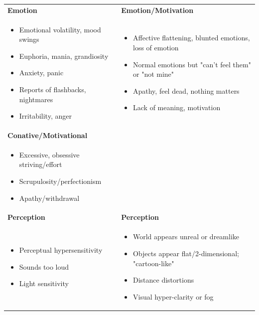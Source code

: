 \documentclass[12pt,letterpaper]{book}
\newenvironment{compactitemize}
{\begin{itemize}[nosep, leftmargin=1em, itemsep=0pt, topsep=0pt]}
{\end{itemize}}
\begin{document}
\begin{longtable}{p{}|p{}}
\textbf{Emotion} & \textbf{Emotion/Motivation} \\*
\begin{compactitemize}
\item Emotional volatility, mood swings
\item Euphoria, mania, grandiosity
\item Anxiety, panic
\item Reports of flashbacks, nightmares
\item Irritability, anger
\end{compactitemize}
&
\begin{compactitemize}
\item Affective flattening, blunted emotions, loss of emotion
\item Normal emotions but "can't feel them" or "not mine"
\item Apathy, feel dead, nothing matters
\item Lack of meaning, motivation
\end{compactitemize} \\[1ex]

\textbf{Conative/Motivational} & \\*
\begin{compactitemize}
\item Excessive, obsessive striving/effort
\item Scrupulosity/perfectionism
\item Apathy/withdrawal
\end{compactitemize}
& \\[1ex]

\textbf{Perception} & \textbf{Perception} \\*
\begin{compactitemize}
\item Perceptual hypersensitivity
\item Sounds too loud
\item Light sensitivity
\end{compactitemize}
&
\begin{compactitemize}
\item World appears unreal or dreamlike
\item Objects appear flat/2-dimensional; "cartoon-like"
\item Distance distortions
\item Visual hyper-clarity or fog
\end{compactitemize} \\[1ex]


\end{longtable}
\end{document}
